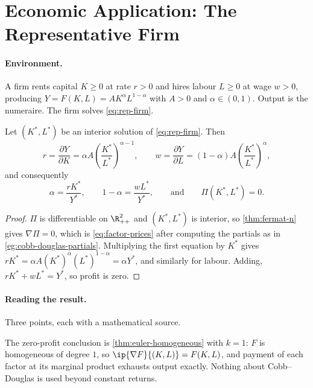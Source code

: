 \section{Economic Application: The Representative Firm}\label{sec:cn-firm}

\paragraph{Environment.} A firm rents capital $K\geq0$ at rate $r>0$ and hires
labour $L\geq0$ at wage $w>0$, producing $Y=F(K,L)=AK^{\alpha}L^{1-\alpha}$ with
$A>0$ and $\alpha\in(0,1)$. Output is the numeraire. The firm solves
\eqref{eq:rep-firm}.

\begin{proposition}\label{prop:rep-firm}
	Let $(K^\ast,L^\ast)$ be an interior solution of \eqref{eq:rep-firm}. Then
	\begin{equation}\label{eq:factor-prices}
		r=\frac{\partial Y}{\partial K}=\alpha A\left(\frac{K^\ast}{L^\ast}\right)^{\alpha-1},
		\qquad
		w=\frac{\partial Y}{\partial L}=(1-\alpha)A\left(\frac{K^\ast}{L^\ast}\right)^{\alpha},
	\end{equation}
	and consequently
	\begin{equation}\label{eq:shares}
		\alpha=\frac{rK^\ast}{Y^\ast},\qquad 1-\alpha=\frac{wL^\ast}{Y^\ast},
		\qquad\text{and}\qquad \Pi(K^\ast,L^\ast)=0 .
	\end{equation}
\end{proposition}

\begin{proof}
	$\Pi$ is differentiable on $\R^2_{++}$ and $(K^\ast,L^\ast)$ is interior, so
	\autoref{thm:fermat-n} gives $\nabla\Pi=0$, which is \eqref{eq:factor-prices}
	after computing the partials as in \autoref{eg:cobb-douglas-partials}.
	Multiplying the first equation by $K^\ast$ gives
	$rK^\ast=\alpha A(K^\ast)^{\alpha}(L^\ast)^{1-\alpha}=\alpha Y^\ast$, and
	similarly for labour. Adding, $rK^\ast+wL^\ast=Y^\ast$, so profit is zero.
\end{proof}

\paragraph{Reading the result.} Three points, each with a mathematical source.

The zero-profit conclusion is \autoref{thm:euler-homogeneous} with $k=1$: $F$ is
homogeneous of degree $1$, so $\ip{\nabla F}{(K,L)}=F(K,L)$, and payment of each
factor at its marginal product exhausts output exactly. Nothing about
Cobb--Douglas is used beyond constant returns.

